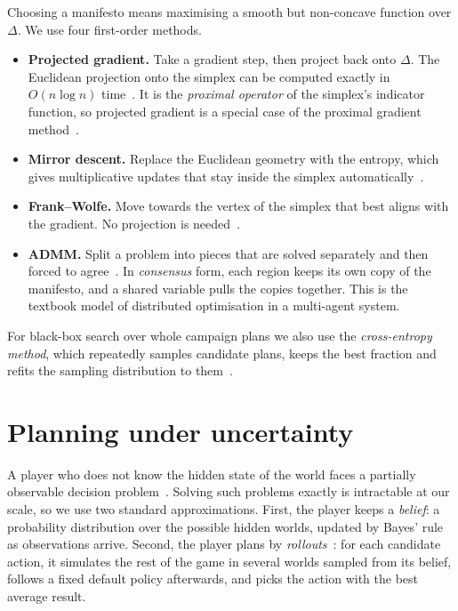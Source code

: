 \documentclass[11pt,a4paper,oneside]{report}
\newcommand{\simplex}{\Delta}
\begin{document}
Choosing a manifesto means maximising a smooth but non-concave function over $\simplex$. We use four
first-order methods.
\begin{itemize}
  \item \textbf{Projected gradient.} Take a gradient step, then project back onto $\simplex$. The
        Euclidean projection onto the simplex can be computed exactly in $O(n\log n)$
        time~\cite{duchi2008}. It is the \emph{proximal operator} of the simplex's indicator function, so
        projected gradient is a special case of the proximal gradient method~\cite{parikh2014}.
  \item \textbf{Mirror descent.} Replace the Euclidean geometry with the entropy, which gives
        multiplicative updates that stay inside the simplex automatically~\cite{beck2003}.
  \item \textbf{Frank--Wolfe.} Move towards the vertex of the simplex that best aligns with the gradient.
        No projection is needed~\cite{frank1956,jaggi2013}.
  \item \textbf{ADMM.} Split a problem into pieces that are solved separately and then forced to
        agree~\cite{boyd2011}. In \emph{consensus} form, each region keeps its own copy of the manifesto,
        and a shared variable pulls the copies together. This is the textbook model of distributed
        optimisation in a multi-agent system.
\end{itemize}
For black-box search over whole campaign plans we also use the \emph{cross-entropy method}, which
repeatedly samples candidate plans, keeps the best fraction and refits the sampling distribution to
them~\cite{rubinstein1999}.

\section{Planning under uncertainty}

A player who does not know the hidden state of the world faces a partially observable decision
problem~\cite{kaelbling1998}. Solving such problems exactly is intractable at our scale, so we use two
standard approximations. First, the player keeps a \emph{belief}: a probability distribution over the
possible hidden worlds, updated by Bayes' rule as observations arrive. Second, the player plans by
\emph{rollouts}~\cite{bertsekas1997}: for each candidate action, it simulates the rest of the game in
several worlds sampled from its belief, follows a fixed default policy afterwards, and picks the action
with the best average result.
\end{document}
